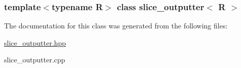 \subsubsection*{template$<$typename R$>$ class slice\_\-outputter$<$ R $>$}



The documentation for this class was generated from the following files:\begin{DoxyCompactItemize}
\item 
\hyperlink{slice__outputter_8hpp}{slice\_\-outputter.hpp}\item 
slice\_\-outputter.cpp\end{DoxyCompactItemize}
